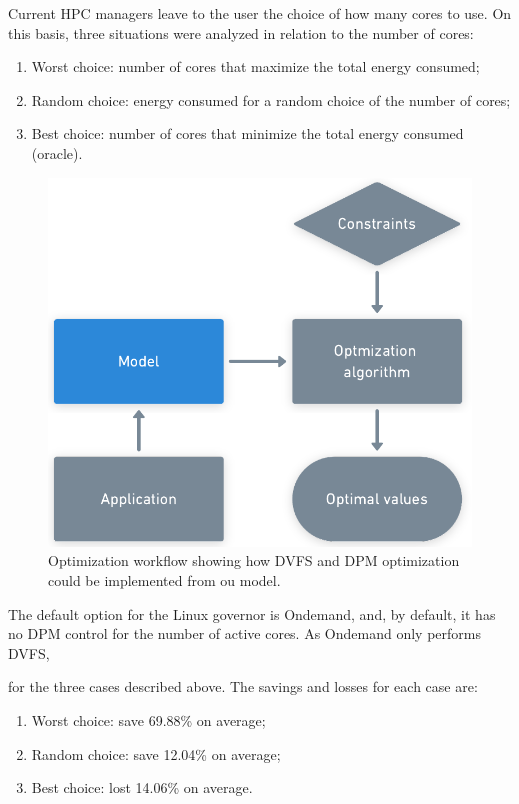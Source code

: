 Current HPC managers leave to the user the choice of how many cores to use. On this basis, three situations were analyzed in relation to the number of cores:

\begin{enumerate}
	\item Worst choice: number of cores that maximize the total energy consumed;
	\item Random choice: energy consumed for a random choice of the number of cores;
	\item Best choice: number of cores that minimize the total energy consumed (oracle).
\end{enumerate}
\begin{figure}[H]
	\centering
	\includegraphics[width=0.8\columnwidth]{models/figures/DVFS optim.pdf}
	\caption{Optimization workflow showing how DVFS and DPM optimization could be implemented from ou model.}
	\label{fig:optim_workflow}
\end{figure}


The default option for the Linux governor is Ondemand, and, by default, it has no DPM control for the number of active cores. As Ondemand only performs DVFS, 

 for the three cases described above. The savings and losses for each case are:

\begin{enumerate}
	\item Worst choice: save 69.88\% on average;
	\item Random choice: save 12.04\% on average;
	\item Best choice: lost 14.06\% on average.
\end{enumerate}

